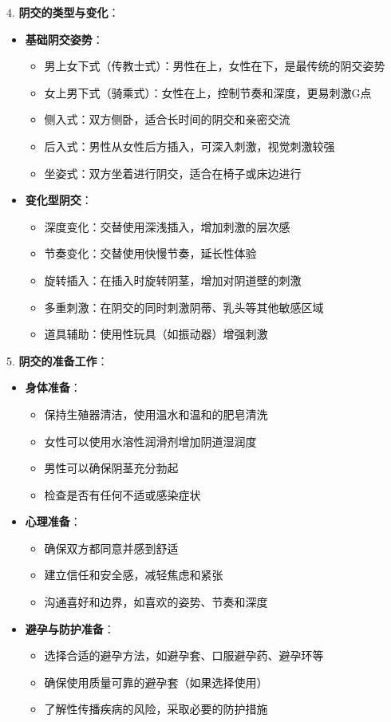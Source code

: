 \documentclass[12pt,UTF8]{ctexbook}
\begin{document}
4. \textbf{阴交的类型与变化}：
\begin{itemize}
	\item \textbf{基础阴交姿势}：
	\begin{itemize}
		\item 男上女下式（传教士式）：男性在上，女性在下，是最传统的阴交姿势
		\item 女上男下式（骑乘式）：女性在上，控制节奏和深度，更易刺激G点
		\item 侧入式：双方侧卧，适合长时间的阴交和亲密交流
		\item 后入式：男性从女性后方插入，可深入刺激，视觉刺激较强
		\item 坐姿式：双方坐着进行阴交，适合在椅子或床边进行
	\end{itemize}
	\item \textbf{变化型阴交}：
	\begin{itemize}
		\item 深度变化：交替使用深浅插入，增加刺激的层次感
		\item 节奏变化：交替使用快慢节奏，延长性体验
		\item 旋转插入：在插入时旋转阴茎，增加对阴道壁的刺激
		\item 多重刺激：在阴交的同时刺激阴蒂、乳头等其他敏感区域
		\item 道具辅助：使用性玩具（如振动器）增强刺激
	\end{itemize}
\end{itemize}

5. \textbf{阴交的准备工作}：
\begin{itemize}
	\item \textbf{身体准备}：
	\begin{itemize}
		\item 保持生殖器清洁，使用温水和温和的肥皂清洗
		\item 女性可以使用水溶性润滑剂增加阴道湿润度
		\item 男性可以确保阴茎充分勃起
		\item 检查是否有任何不适或感染症状
	\end{itemize}
	\item \textbf{心理准备}：
	\begin{itemize}
		\item 确保双方都同意并感到舒适
		\item 建立信任和安全感，减轻焦虑和紧张
		\item 沟通喜好和边界，如喜欢的姿势、节奏和深度
	\end{itemize}
	\item \textbf{避孕与防护准备}：
	\begin{itemize}
		\item 选择合适的避孕方法，如避孕套、口服避孕药、避孕环等
		\item 确保使用质量可靠的避孕套（如果选择使用）
		\item 了解性传播疾病的风险，采取必要的防护措施
	\end{itemize}
\end{itemize}
\end{document}
